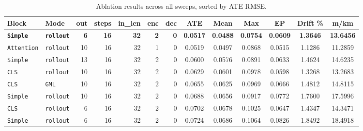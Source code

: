 \begin{table}[H]
\centering
\caption{Ablation results across all sweeps, sorted by ATE RMSE.}
\label{tab:ablation_all}
\scriptsize
\setlength{\tabcolsep}{4pt}

\begin{tabular}{
l
l
r
r
r
r
r
S[table-format=1.4]
S[table-format=1.4]
S[table-format=2.4]
S[table-format=2.4]
S[table-format=3.4]
S[table-format=4.4]
}
\toprule
\textbf{Block} &
\textbf{Mode} &
\textbf{out} &
\textbf{steps} &
\textbf{in\_len} &
\textbf{enc} &
\textbf{dec} &
\textbf{ATE} &
\textbf{Mean} &
\textbf{Max} &
\textbf{EP} &
\textbf{Drift \%} &
\textbf{m/km}
\\
\midrule

\texttt{\textbf{Simple}} & \texttt{\textbf{rollout}} & \textbf{6} & \textcolor{gray!55}{\textbf{16}} & \textcolor{gray!55}{\textbf{32}} & \textcolor{gray!55}{\textbf{2}} & \textcolor{gray!55}{\textbf{0}} & \bfseries 0.0517 & \bfseries 0.0488 & \bfseries 0.0754 & \bfseries 0.0609 & \bfseries 1.3646 & \bfseries 13.6456 \\
\texttt{Attention} & \texttt{rollout} & 10 & \textcolor{gray!55}{16} & \textcolor{gray!55}{32} & 1 & 0 & 0.0519 & 0.0497 & 0.0868 & 0.0515 & 1.1286 & 11.2859 \\
\texttt{Simple} & \texttt{rollout} & 13 & \textcolor{gray!55}{16} & \textcolor{gray!55}{32} & \textcolor{gray!55}{2} & \textcolor{gray!55}{0} & 0.0600 & 0.0576 & 0.0891 & 0.0633 & 1.4624 & 14.6235 \\
\texttt{CLS} & \texttt{rollout} & 10 & \textcolor{gray!55}{16} & \textcolor{gray!55}{32} & \textcolor{gray!55}{2} & \textcolor{gray!55}{0} & 0.0629 & 0.0601 & 0.0978 & 0.0598 & 1.3268 & 13.2683 \\
\texttt{CLS} & \texttt{GML} & 10 & \textcolor{gray!55}{16} & \textcolor{gray!55}{32} & \textcolor{gray!55}{2} & \textcolor{gray!55}{0} & 0.0655 & 0.0625 & 0.0969 & 0.0666 & 1.4812 & 14.8115 \\
\texttt{Simple} & \texttt{rollout} & \textcolor{gray!55}{10} & 16 & \textcolor{gray!55}{32} & \textcolor{gray!55}{2} & \textcolor{gray!55}{0} & 0.0688 & 0.0656 & 0.0917 & 0.0772 & 1.7600 & 17.5996 \\
\texttt{CLS} & \texttt{rollout} & 6 & \textcolor{gray!55}{16} & \textcolor{gray!55}{32} & \textcolor{gray!55}{2} & \textcolor{gray!55}{0} & 0.0702 & 0.0678 & 0.1025 & 0.0647 & 1.4347 & 14.3471 \\
\texttt{Simple} & \texttt{rollout} & 6 & \textcolor{gray!55}{16} & \textcolor{gray!55}{32} & \textcolor{gray!55}{2} & \textcolor{gray!55}{0} & 0.0724 & 0.0686 & 0.1064 & 0.0826 & 1.8492 & 18.4918 \\

\end{tabular}
\end{table}
